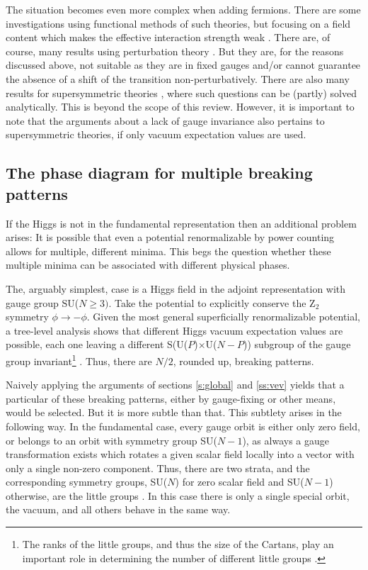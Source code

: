 \documentclass[final,twoside,12pt]{article}
\newcommand*{\1}{1\!\!\!\bot}
\begin{document}
The situation becomes even more complex when adding fermions. There are some investigations using functional methods of such theories, but focusing on a field content which makes the effective interaction strength weak \cite{Litim:2014uca,Litim:2015iea}. There are, of course, many results using perturbation theory \cite{Kapusta:2006pm,Branco:2011iw,Ivanov:2017dad}. But they are, for the reasons discussed above, not suitable as they are in fixed gauges and/or cannot guarantee the absence of a shift of the transition non-perturbatively. There are also many results for supersymmetric theories \cite{Weinberg:2000cr}, where such questions can be (partly) solved analytically. This is beyond the scope of this review. However, it is important to note that the arguments about a lack of gauge invariance also pertains to supersymmetric theories, if only vacuum expectation values are used.

\subsection{The phase diagram for multiple breaking patterns}\label{ss:strata}

If the Higgs is not in the fundamental representation then an additional problem arises: It is possible that even a potential renormalizable by power counting allows for multiple, different minima. This begs the question whether these multiple minima can be associated with different physical phases.

The, arguably simplest, case is a Higgs field in the adjoint representation with gauge group SU($N\ge 3)$. Take the potential to explicitly conserve the Z$_2$ symmetry $\phi\to-\phi$. Given the most general superficially renormalizable potential, a tree-level analysis shows that different Higgs vacuum expectation values are possible, each one leaving a different S(U($P$)$\times$U($N-P$)) subgroup of the gauge group invariant\footnote{The ranks of the little groups, and thus the size of the Cartans, play an important role in determining the number of different little groups \cite{O'Raifeartaigh:1986vq}.} \cite{Li:1973mq,Ruegg:1980gf,Murphy:1983rf,Maas:2017xzh}. Thus, there are $N/2$, rounded up, breaking patterns.

Naively applying the arguments of sections \ref{s:global} and \ref{ss:vev} yields that a particular of these breaking patterns, either by gauge-fixing or other means, would be selected. But it is more subtle than that. This subtlety arises in the following way. In the fundamental case, every gauge orbit is either only zero field, or belongs to an orbit with symmetry group SU($N-1$), as always a gauge transformation exists which rotates a given scalar field locally into a vector with only a single non-zero component. Thus, there are two strata, and the corresponding symmetry groups, SU($N$) for zero scalar field and SU($N-1$) otherwise, are the little groups \cite{O'Raifeartaigh:1986vq}. In this case there is only a single special orbit, the vacuum, and all others behave in the same way.
\end{document}
